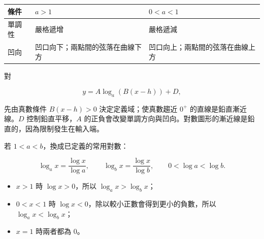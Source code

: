 \documentclass[11pt,a4paper]{article}
\newcounter{none}
\providecommand{\tightlist}{%
  \setlength{\itemsep}{0pt}\setlength{\parskip}{0pt}}
\begin{document}
{\def\LTcaptype{none} %
\begin{longtable}[]{@{}
  >{\raggedright\arraybackslash}p{}
  >{\raggedright\arraybackslash}p{}
  >{\raggedright\arraybackslash}p{}@{}}
\toprule\noalign{}
\begin{minipage}[b]{\linewidth}\raggedright
條件
\end{minipage} & \begin{minipage}[b]{\linewidth}\raggedright
\(a>1\)
\end{minipage} & \begin{minipage}[b]{\linewidth}\raggedright
\(0<a<1\)
\end{minipage} \\
\midrule\noalign{}
\endhead
\bottomrule\noalign{}
\endlastfoot
單調性 & 嚴格遞增 & 嚴格遞減 \\
凹向 & 凹口向下；兩點間的弦落在曲線下方 & 凹口向上；兩點間的弦落在曲線上方 \\
\end{longtable}
}

對

\[
y=A\log_a(B(x-h))+D,
\]

先由真數條件 \(B(x-h)>0\) 決定定義域；使真數趨近 \(0^+\) 的直線是鉛直漸近線。\(D\) 控制鉛直平移，\(A\) 的正負會改變單調方向與凹向。對數圖形的漸近線是鉛直的，因為限制發生在輸入端。

若 \(1<a<b\)，換成已定義的常用對數：

\[
\log_a x=\frac{\log x}{\log a},
\qquad
\log_b x=\frac{\log x}{\log b},
\qquad
0<\log a<\log b.
\]

\begin{itemize}
\tightlist
\item
  \(x>1\) 時 \(\log x>0\)，所以 \(\log_a x>\log_b x\)；
\item
  \(0<x<1\) 時 \(\log x<0\)，除以較小正數會得到更小的負數，所以 \(\log_a x<\log_b x\)；
\item
  \(x=1\) 時兩者都為 \(0\)。
\end{itemize}
\end{document}

